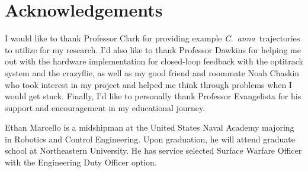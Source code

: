 \documentclass[onecolumn,10pt]{IEEEtran}
\newcommand{\myroot}{../}
\newcommand{\Canna}{\emph{C.~anna}}
\begin{document}
\clearpage



\section*{Acknowledgements}
I would like to thank Professor Clark for providing example \Canna\ trajectories to utilize for my research. I'd also like to thank Professor Dawkins for helping me out with the hardware implementation for closed-loop feedback with the optitrack system and the crazyflie, as well as my good friend and roommate Noah Chaskin who took interest in my project and helped me think through problems when I would get stuck. Finally, I'd like to personally thank Professor Evangelista for his support and encouragement in my educational journey.







%

  


\begin{IEEEbiography}{Ethan Marcello} is a midshipman at the United States Naval Academy majoring in Robotics and Control Engineering. Upon graduation, he will attend graduate school at Northeastern University.  He has service selected Surface Warfare Officer with the Engineering Duty Officer option. 
\end{IEEEbiography}

%
\end{document}
